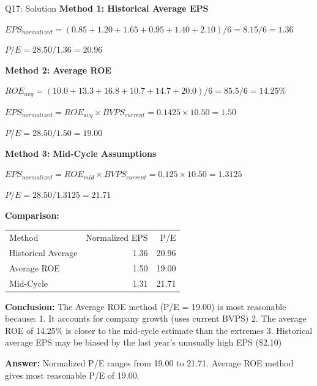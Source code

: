 \documentclass{beamer}
\renewcommand{\scriptsize}{\fontsize{6pt}{7pt}\selectfont}
\begin{document}
	\begin{frame}{Q17: Solution}
		\scriptsize
		\textbf{Method 1: Historical Average EPS}
		
		$EPS_{normalized} = (0.85 + 1.20 + 1.65 + 0.95 + 1.40 + 2.10)/6 = 8.15/6 = 1.36$
		
		$P/E = 28.50/1.36 = 20.96$
		
		\vspace{2pt}
		\textbf{Method 2: Average ROE}
		
		$ROE_{avg} = (10.0 + 13.3 + 16.8 + 10.7 + 14.7 + 20.0)/6 = 85.5/6 = 14.25\%$
		
		$EPS_{normalized} = ROE_{avg} \times BVPS_{current} = 0.1425 \times 10.50 = 1.50$
		
		$P/E = 28.50/1.50 = 19.00$
		
		\vspace{2pt}
		\textbf{Method 3: Mid-Cycle Assumptions}
		
		$EPS_{normalized} = ROE_{mid} \times BVPS_{current} = 0.125 \times 10.50 = 1.3125$
		
		$P/E = 28.50/1.3125 = 21.71$
		
		\vspace{2pt}
		\textbf{Comparison:}
		\begin{tabular}{lrr}
			Method & Normalized EPS & P/E \\
			Historical Average & 1.36 & 20.96 \\
			Average ROE & 1.50 & 19.00 \\
			Mid-Cycle & 1.31 & 21.71 \\
		\end{tabular}
		
		\vspace{2pt}
		\textbf{Conclusion:} The Average ROE method (P/E = 19.00) is most reasonable because:
		1. It accounts for company growth (uses current BVPS)
		2. The average ROE of 14.25\% is closer to the mid-cycle estimate than the extremes
		3. Historical average EPS may be biased by the last year's unusually high EPS (\$2.10)
		
		\textbf{Answer:} Normalized P/E ranges from 19.00 to 21.71. Average ROE method gives most reasonable P/E of 19.00.
	\end{frame}
	
\end{document}
